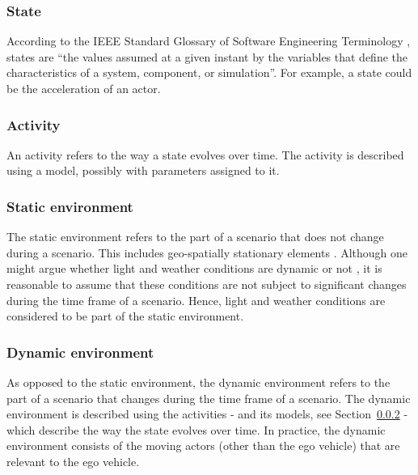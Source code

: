 \subsubsection{State}
\label{sec:state}
According to the IEEE Standard Glossary of Software Engineering Terminology \cite{ieee1990glossary}, states are ``the values assumed at a given instant by the variables that define the characteristics of a system, component, or simulation''. For example, a state could be the acceleration of an actor.

\subsubsection{Activity}
\label{sec:activity}
An activity refers to the way a state evolves over time. The activity is described using a model, possibly with parameters assigned to it.

\subsubsection{Static environment}
\label{sec:static environment}
The static environment refers to the part of a scenario that does not change during a scenario. This includes geo-spatially stationary elements \cite{ulbrich2015}. Although one might argue whether light and weather conditions are dynamic or not \cite{geyer2014,bach2016modelbased}, it is reasonable to assume that these conditions are not subject to significant changes during the time frame of a scenario. Hence, light and weather conditions are considered to be part of the static environment.

\subsubsection{Dynamic environment}
\label{sec:dynamic environment}
As opposed to the static environment, the dynamic environment refers to the part of a scenario that changes during the time frame of a scenario. The dynamic environment is described using the activities - and its models, see Section~\ref{sec:activity} - which describe the way the state evolves over time. In practice, the dynamic environment consists of the moving actors (other than the ego vehicle) that are relevant to the ego vehicle.

